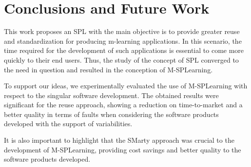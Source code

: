 \section{Conclusions and Future Work}\label{section7}

This work proposes an SPL with the main objective is to provide greater reuse and standardization for producing m-learning applications.
In this scenario, the time required for the development of such applications is essential to come more quickly to their end users. Thus, the study of the concept of SPL converged to the need in question and resulted in the conception of M-SPLear\allowbreak ning.

To support our ideas, we experimentally evaluated the use of M-SPLear\allowbreak ning with respect to the singular software development. The obtained results were significant for the reuse approach, showing a reduction on time-to-market and a better quality in terms of faults when considering the software products developed with the support of variabilities. 

It is also important to highlight that the SMarty approach was crucial to the development of M-SPLear\allowbreak ning, providing cost savings and better quality to the software products developed.

